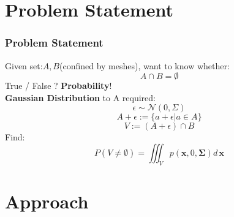 \documentclass{beamer}
\begin{document}

\section{Problem Statement} %


\begin{frame}
\frametitle{Problem Statement}
Given set:$A, B$(confined by meshes),
want to know whether: 
$$A \cap B = \emptyset$$
True / False ?
\textbf{Probability}!
\\
\textbf{Gaussian Distribution} to A required:
$$\epsilon \sim \mathcal{N}(0, \Sigma)$$
$$A + \epsilon := \{a+\epsilon | a \in A\}$$
$$V := (A+\epsilon) \cap B$$
Find: 
$$P(V \neq \emptyset) = \iiint_Vp(\mathbf{x},0,\mathbf{\Sigma})d\,\mathbf{x}$$
\end{frame}

\section{Approach} %

\end{document}
